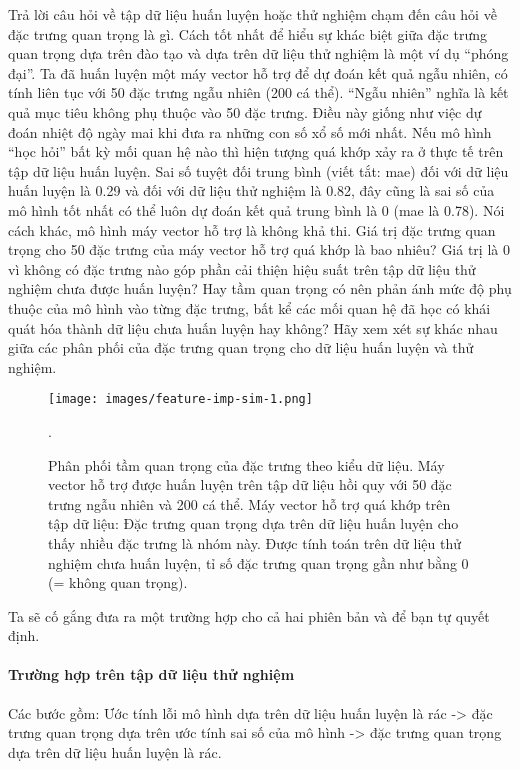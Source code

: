 Trả lời câu hỏi về tập dữ liệu huấn luyện hoặc thử nghiệm chạm đến câu hỏi về đặc trưng quan trọng là gì. Cách tốt nhất để hiểu sự khác biệt giữa đặc trưng quan trọng dựa trên đào tạo và dựa trên dữ liệu thử nghiệm là một ví dụ ``phóng đại''. Ta đã huấn luyện một máy vector hỗ trợ để dự đoán kết quả ngẫu nhiên, có tính liên tục với 50 đặc trưng ngẫu nhiên (200 cá thể). ``Ngẫu nhiên'' nghĩa là kết quả mục tiêu không phụ thuộc vào 50 đặc trưng. Điều này giống như việc dự đoán nhiệt độ ngày mai khi đưa ra những con số xổ số mới nhất. Nếu mô hình ``học hỏi'' bất kỳ mối quan hệ nào thì hiện tượng quá khớp xảy ra ở thực tế trên tập dữ liệu huấn luyện. Sai số tuyệt đối trung bình (viết tắt: mae) đối với dữ liệu huấn luyện là 0.29 và đối với dữ liệu thử nghiệm là 0.82, đây cũng là sai số của mô hình tốt nhất có thể luôn dự đoán kết quả trung bình là 0 (mae là 0.78). Nói cách khác, mô hình máy vector hỗ trợ là không khả thi. Giá trị đặc trưng quan trọng cho 50 đặc trưng của máy vector hỗ trợ quá khớp là bao nhiêu? Giá trị là 0 vì không có đặc trưng nào góp phần cải thiện hiệu suất trên tập dữ liệu thử nghiệm chưa được huấn luyện? Hay tầm quan trọng có nên phản ánh mức độ phụ thuộc của mô hình vào từng đặc trưng, bất kể các mối quan hệ đã học có khái quát hóa thành dữ liệu  chưa huấn luyện hay không? Hãy xem xét sự khác nhau giữa các phân phối của đặc trưng quan trọng cho dữ liệu huấn luyện và thử nghiệm.


\begin{figure*}[h!]
	\centering
	\texttt{[image: images/feature-imp-sim-1.png]}
	\label{fig:5_27}
	\caption{Phân phối tầm quan trọng của đặc trưng theo kiểu dữ liệu. Máy vector hỗ trợ được huấn luyện trên tập dữ liệu hồi quy với 50 đặc trưng ngẫu nhiên và 200 cá thể. Máy vector hỗ trợ quá khớp trên tập dữ liệu: Đặc trưng quan trọng dựa trên dữ liệu huấn luyện cho thấy nhiều đặc trưng là nhóm này. Được tính toán trên dữ liệu thử nghiệm chưa huấn luyện, tỉ số đặc trưng quan trọng gần như bằng 0 (= không quan trọng).}.
	
\end{figure*}

Ta sẽ cố gắng đưa ra một trường hợp cho cả hai phiên bản và để bạn tự quyết định.

\paragraph{Trường hợp trên tập dữ liệu thử nghiệm}

Các bước gồm: Ước tính lỗi mô hình dựa trên dữ liệu huấn luyện là rác -> đặc trưng quan trọng dựa trên ước tính sai số của mô hình -> đặc trưng quan trọng dựa trên dữ liệu huấn luyện là rác.

